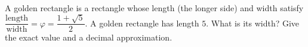 A golden rectangle is a rectangle whose length (the longer side) and width satisfy $\dfrac{\text{length}}{\text{width}}=\varphi=\dfrac{1+\sqrt5}{2}$. A golden rectangle has length $5$. What is its width? Give the exact value and a decimal approximation.
